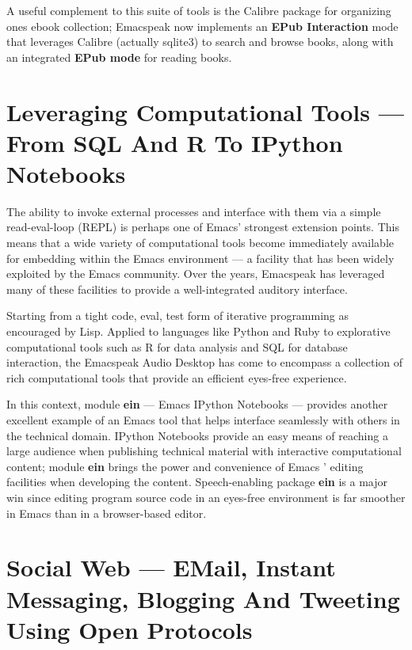 \documentclass[11pt]{article}
\begin{document}
A useful complement to this suite of tools is the Calibre package
for organizing ones ebook collection; Emacspeak now implements an
\textbf{EPub Interaction} mode that leverages Calibre (actually sqlite3)
to search and browse books, along with an integrated \textbf{EPub mode}
for reading books.

\section{Leveraging Computational Tools —  From SQL And R To IPython Notebooks}
\label{sec:org5409534}

The ability to invoke external processes and interface with them
via a simple read-eval-loop (REPL) is perhaps one of Emacs'
strongest extension points. This means that a wide variety of
computational tools become immediately available for embedding
within the Emacs environment — a facility that has been widely
exploited by the Emacs community. Over the years, Emacspeak has
leveraged many of these facilities to provide a well-integrated
auditory interface.

Starting from a tight code, eval, test form of iterative
programming as encouraged by Lisp. Applied to languages like
Python and Ruby to explorative computational tools such as R for
data analysis and SQL for database interaction, the Emacspeak
Audio Desktop has come to encompass a collection of rich
computational tools that provide an efficient eyes-free
experience.


In this context, module \textbf{ein} — Emacs IPython Notebooks —
provides another excellent example of an Emacs tool that helps
interface seamlessly with others in the technical domain. IPython
Notebooks provide an easy means of reaching a large audience when
publishing technical material with interactive computational
content; module \textbf{ein} brings the power and convenience of Emacs '
editing facilities when developing the content. Speech-enabling
package \textbf{ein} is a major win since editing program source code
in an eyes-free environment is far smoother in Emacs than in a
browser-based editor.

\section{Social Web  — EMail, Instant Messaging, Blogging  And Tweeting Using Open Protocols}
\label{sec:org3139d16}
\end{document}
